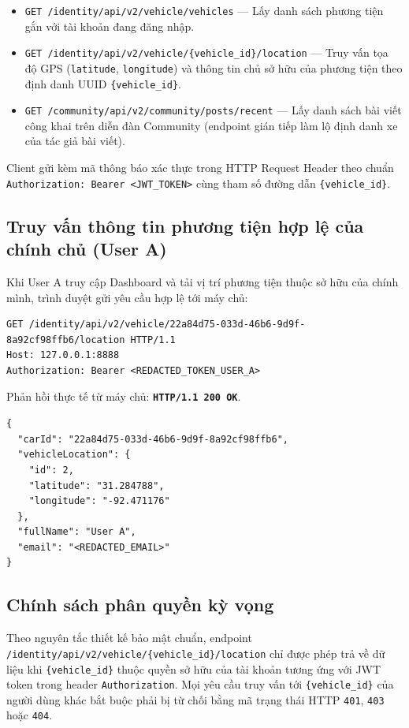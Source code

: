 \documentclass[11pt, a4paper]{article}
\begin{document}
\begin{itemize}
    \item \texttt{GET /identity/api/v2/vehicle/vehicles} --- Lấy danh sách phương tiện gắn với tài khoản đang đăng nhập.
    \item \texttt{GET /identity/api/v2/vehicle/\{vehicle\_id\}/location} --- Truy vấn tọa độ GPS (\texttt{latitude}, \texttt{longitude}) và thông tin chủ sở hữu của phương tiện theo định danh UUID \texttt{\{vehicle\_id\}}.
    \item \texttt{GET /community/api/v2/community/posts/recent} --- Lấy danh sách bài viết công khai trên diễn đàn Community (endpoint gián tiếp làm lộ định danh xe của tác giả bài viết).
\end{itemize}

Client gửi kèm mã thông báo xác thực trong HTTP Request Header theo chuẩn \texttt{Authorization: Bearer <JWT\_TOKEN>} cùng tham số đường dẫn \texttt{\{vehicle\_id\}}.

\subsection{Truy vấn thông tin phương tiện hợp lệ của chính chủ (User A)}

Khi User A truy cập Dashboard và tải vị trí phương tiện thuộc sở hữu của chính mình, trình duyệt gửi yêu cầu hợp lệ tới máy chủ:

\begin{verbatim}
GET /identity/api/v2/vehicle/22a84d75-033d-46b6-9d9f-8a92cf98ffb6/location HTTP/1.1
Host: 127.0.0.1:8888
Authorization: Bearer <REDACTED_TOKEN_USER_A>
\end{verbatim}

Phản hồi thực tế từ máy chủ: \textbf{\texttt{HTTP/1.1 200 OK}}.

\begin{verbatim}
{
  "carId": "22a84d75-033d-46b6-9d9f-8a92cf98ffb6",
  "vehicleLocation": {
    "id": 2,
    "latitude": "31.284788",
    "longitude": "-92.471176"
  },
  "fullName": "User A",
  "email": "<REDACTED_EMAIL>"
}
\end{verbatim}

\subsection{Chính sách phân quyền kỳ vọng}

Theo nguyên tắc thiết kế bảo mật chuẩn, endpoint \texttt{/identity/api/v2/vehicle/\{vehicle\_id\}/location} chỉ được phép trả về dữ liệu khi \texttt{\{vehicle\_id\}} thuộc quyền sở hữu của tài khoản tương ứng với JWT token trong header \texttt{Authorization}. Mọi yêu cầu truy vấn tới \texttt{\{vehicle\_id\}} của người dùng khác bắt buộc phải bị từ chối bằng mã trạng thái HTTP \texttt{401}, \texttt{403} hoặc \texttt{404}.
\end{document}
